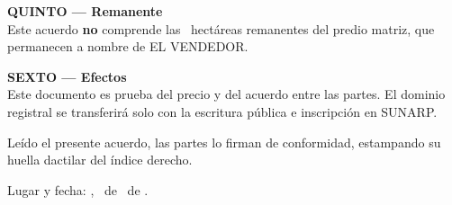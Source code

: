 \documentclass[12pt,a4paper]{article}
\begin{document}
\vspace{0.45em}
\noindent\textbf{QUINTO --- Remanente}\\[0.15em]
Este acuerdo \textbf{no} comprende las \AreaRemanenteHa\ hectáreas remanentes del predio matriz, que permanecen a nombre de EL VENDEDOR.

\vspace{0.45em}
\noindent\textbf{SEXTO --- Efectos}\\[0.15em]
Este documento es prueba del precio y del acuerdo entre las partes. El dominio registral se transferirá solo con la escritura pública e inscripción en SUNARP.

\vspace{0.85em}
\noindent Leído el presente acuerdo, las partes lo firman de conformidad, estampando su huella dactilar del índice derecho.

\vspace{1.1em}
\noindent Lugar y fecha: \textbf{\LugarOtorgamiento}, \DiaOtorgamiento\ de \MesOtorgamiento\ de \AnioOtorgamiento.

\vspace{1.35em}

\vspace{1.1em}
\\[0.35em]
\noindent
{}
\hfill
{}
\end{document}
